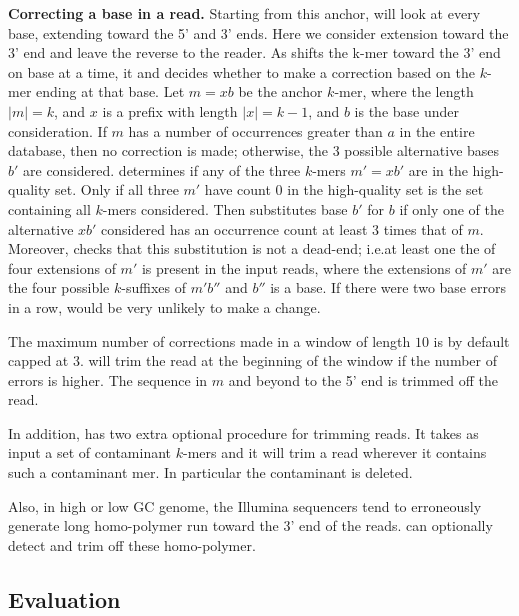\documentclass[10pt]{bmc_article}
\newenvironment{bmcformat}{\fussy\setboolean{publ}{true}}{\fussy}
\begin{document}
\begin{bmcformat}
{\bf Correcting a base in a read.}
Starting from this anchor, \quorum will look at every base, extending toward the 5' and 3' ends.  Here we consider extension toward the 3' end and leave the reverse to the reader. As \quorum shifts the k-mer toward the 3' end on base at a time, it and decides whether 
to make a correction based on the $k$-mer ending at that base.
Let $m = xb$ be the anchor $k$-mer, where the length $|m| = k$, and $x$ is a prefix with length $|x| = k - 1$, and $b$ is the base under consideration.
If $m$ has a number of occurrences greater than $a$ in the entire database, then no correction is made; otherwise, the 3 possible alternative bases $b'$ are considered.
\quorum determines if any of the three $k$-mers $m' = xb'$ are in the high-quality set.
Only if all three $m'$ have count 0 in the high-quality set is the set containing all $k$-mers considered. Then
\quorum substitutes base $b'$ for $b$ if only one of the alternative $xb'$ considered has an occurrence count at least 3 times that of $m$.
Moreover, \quorum checks that this substitution is not a dead-end; i.e.\@ at least one the of four extensions of $m'$ is present in the input reads, where the extensions of $m'$ are the four possible $k$-suffixes of $m'b''$ and $b''$ is a base. If there were two base errors in a row, \quorum would be very unlikely to make a change. 

The maximum number of corrections made in a window of length $10$ is by default capped at $3$.
\quorum will trim the read at the beginning of the window if the number of errors is higher.
The sequence in $m$ and beyond to the 5' end is trimmed off the read. 

In addition, \quorum has two extra optional procedure for trimming reads. 
It takes as input a set of contaminant $k$-mers and it will trim a read wherever it contains such a contaminant mer. In particular the contaminant is deleted.

Also, in high or low GC genome, the Illumina sequencers tend to erroneously generate long homo-polymer run toward the 3' end of the reads.
\quorum can optionally detect and trim off these homo-polymer.


\subsection*{Evaluation}





\end{bmcformat}
\end{document}

